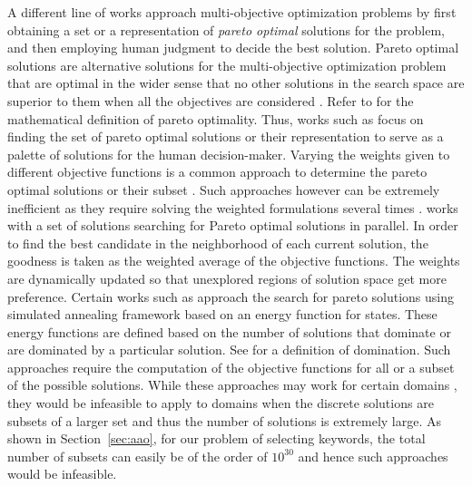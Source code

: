 A different line of works approach multi-objective optimization problems by first obtaining a set or a representation of \textit{pareto optimal} solutions for the problem, and then employing human judgment to decide the best solution. Pareto optimal solutions are alternative solutions for the multi-objective optimization problem that are optimal in the wider sense that no other solutions in the search space are superior to them when all the objectives are considered \cite{SumanAnnealing05}. Refer to \cite{Marler04} for the mathematical definition of pareto optimality. Thus, works such as \cite{Messac02,Martinez01,Messac01} focus on finding the set of pareto optimal solutions or their representation to serve as a palette of solutions for the human decision-maker. Varying the weights given to different objective functions is a common approach to determine the pareto optimal solutions or their subset \cite{Marler04}. Such approaches however can be extremely inefficient as they require solving the weighted formulations several times \cite{Marler04}. \cite{Hansen97} works with a set of solutions searching for Pareto optimal solutions in parallel. In order to find the best candidate in the neighborhood of each current solution, the goodness is taken as the weighted average of the objective functions. The weights are dynamically updated so that unexplored regions of solution space get more preference. Certain works such as \cite{Suman05,Smith04,Bandyopadhyay08} approach the search for pareto solutions using simulated annealing framework based on an energy function for states. These energy functions are defined based on the number of solutions that dominate or are dominated by a particular solution. See \cite{Bandyopadhyay08} for a definition of domination. Such approaches require the computation of the objective functions for all or a subset of the possible solutions. While these approaches may work for certain domains \cite{Suman05,Smith04,Bandyopadhyay08}, they would be infeasible to apply to domains when the discrete solutions are subsets of a larger set and thus the number of solutions is extremely large. As shown in Section~\ref{sec:aao}, for our problem of selecting keywords, the total number of subsets can easily be of the order of $10^{30}$ and hence such approaches would be infeasible. 
